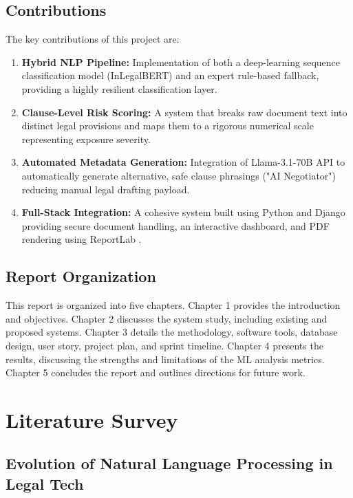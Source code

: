 \documentclass[a4paper,12pt]{report}
\begin{document}
\section{Contributions}

The key contributions of this project are:

\begin{enumerate}
    \item \textbf{Hybrid NLP Pipeline:} Implementation of both a deep-learning sequence classification model (InLegalBERT) and an expert rule-based fallback, providing a highly resilient classification layer.
    \item \textbf{Clause-Level Risk Scoring:} A system that breaks raw document text into distinct legal provisions and maps them to a rigorous numerical scale representing exposure severity.
    \item \textbf{Automated Metadata Generation:} Integration of Llama-3.1-70B API to automatically generate alternative, safe clause phrasings ("AI Negotiator") reducing manual legal drafting payload.
    \item \textbf{Full-Stack Integration:} A cohesive system built using Python and Django providing secure document handling, an interactive dashboard, and PDF rendering using ReportLab \cite{reportlab}.
\end{enumerate}

\section{Report Organization}

This report is organized into five chapters. Chapter 1 provides the introduction and objectives. Chapter 2 discusses the system study, including existing and proposed systems. Chapter 3 details the methodology, software tools, database design, user story, project plan, and sprint timeline. Chapter 4 presents the results, discussing the strengths and limitations of the ML analysis metrics. Chapter 5 concludes the report and outlines directions for future work.

\chapter{Literature Survey}

\section{Evolution of Natural Language Processing in Legal Tech}
\end{document}

